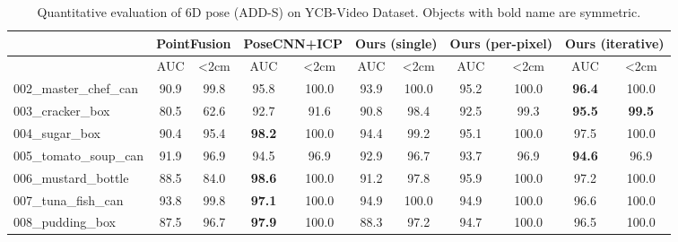 \documentclass[10pt,twocolumn,letterpaper]{article}
\begin{document}
\begin{table*}
\small
\centering
\caption{Quantitative evaluation of 6D pose (ADD-S\cite{xiang2017posecnn}) on YCB-Video Dataset. Objects with bold name are symmetric.}
\begin{tabular}{l|c|c|c|c|c|c|c|c|c|c}
\hline
                         & \multicolumn{2}{c}{PointFusion}~\cite{xu2017pointfusion} & \multicolumn{2}{c}{PoseCNN+ICP}~\cite{xiang2017posecnn} & \multicolumn{2}{c}{Ours (single)} & \multicolumn{2}{c}{Ours (per-pixel)} & \multicolumn{2}{c}{Ours (iterative)} \\ \hline
                         & AUC       & \textless{}2cm      & AUC            & \textless{}2cm & AUC        & \textless{}2cm       & AUC          & \textless{}2cm         & AUC              & \textless{}2cm    \\ \hline
002\_master\_chef\_can   & 90.9      & 99.8                & 95.8           & 100.0          & 93.9       & 100.0                & 95.2         & 100.0                  & \textbf{96.4}    & 100.0             \\
003\_cracker\_box        & 80.5      & 62.6                & 92.7           & 91.6           & 90.8       & 98.4                 & 92.5         & 99.3                   & \textbf{95.5}    & \textbf{99.5}     \\
004\_sugar\_box          & 90.4      & 95.4                & \textbf{98.2}  & 100.0          & 94.4       & 99.2                 & 95.1         & 100.0                  & 97.5             & 100.0             \\
005\_tomato\_soup\_can   & 91.9      & 96.9                & 94.5           & 96.9           & 92.9       & 96.7                 & 93.7         & 96.9                   & \textbf{94.6}    & 96.9              \\
006\_mustard\_bottle     & 88.5      & 84.0                & \textbf{98.6}  & 100.0          & 91.2       & 97.8                 & 95.9         & 100.0                  & 97.2             & 100.0             \\
007\_tuna\_fish\_can     & 93.8      & 99.8                & \textbf{97.1}  & 100.0          & 94.9       & 100.0                & 94.9         & 100.0                  & 96.6             & 100.0             \\
008\_pudding\_box        & 87.5      & 96.7                & \textbf{97.9}  & 100.0          & 88.3       & 97.2                 & 94.7         & 100.0                  & 96.5             & 100.0             \\

\end{tabular}
\end{table*}
\end{document}
